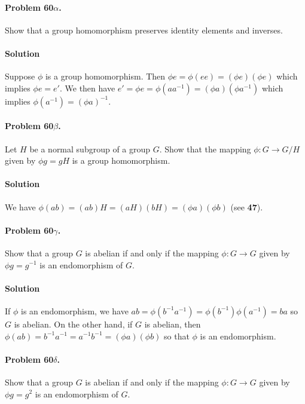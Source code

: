 \paragraph{Problem 60$\alpha$.}
Show that a group homomorphism preserves identity elements and inverses.

\paragraph*{Solution}
Suppose $\phi$ is a group homomorphism. Then $\phi e = \phi (ee) = (\phi e) (\phi e)$
which implies $\phi e = e'$. We then have $e' = \phi e = \phi (aa^{-1}) =
(\phi a) (\phi a^{-1})$ which implies $\phi( a^{-1}) = (\phi a)^{-1}$.

\paragraph{Problem 60$\beta$.}
Let $H$ be a normal subgroup of a group $G$. Show that the mapping $\phi : G
\rightarrow G/H$ given by $\phi g = gH$ is a group homomorphism.

\paragraph*{Solution}
We have $\phi (ab) = (ab)H = (aH)(bH) = (\phi a)(\phi b)$ (see \textbf{47}).

\paragraph{Problem 60$\gamma$.}
Show that a group $G$ is abelian if and only if the mapping $\phi : G \rightarrow
G$ given by $\phi g = g^{-1}$ is an endomorphism of $G$.

\paragraph*{Solution}
If $\phi$ is an endomorphism, we have $ab = \phi(b^{-1}a^{-1}) = \phi(b^{-1})\phi(a^{-1})
= ba$ so $G$ is abelian. On the other hand, if $G$ is abelian, then $\phi (ab)
= b^{-1}a^{-1} = a^{-1}b^{-1} = (\phi a)(\phi b)$ so that $\phi$ is an endomorphism.

\paragraph{Problem 60$\delta$.}
Show that a group $G$ is abelian if and only if the mapping $\phi : G \rightarrow
G$ given by $\phi g = g^2$ is an endomorphism of $G$.

